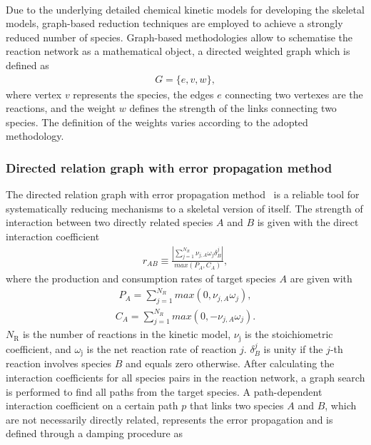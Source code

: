 \begin{refsection}
\\
Due to the underlying detailed chemical kinetic models for developing the skeletal models, graph-based reduction techniques are employed to achieve a strongly reduced number of species. Graph-based methodologies allow to schematise the reaction network as a mathematical object, a directed weighted graph which is defined as
\begin{align}
G = \{e,v,w\},
\end{align}
where vertex $v$ represents the species, the edges $e$ connecting two vertexes are the reactions, and the weight $w$ defines the strength of the links connecting two species. The definition of the weights varies according to the adopted methodology.


\subsubsection{Directed relation graph with error propagation method}
The directed relation graph with error propagation method~\cite{PepiotDesjardins2008a} is a reliable tool for systematically reducing mechanisms to a skeletal version of itself. The strength of interaction between two directly related species $A$ and $B$ is given with the direct interaction coefficient
\begin{align}
r_{AB} \equiv \frac{|\sum_{j=1}^{N_R} \nu_{j,A}\omega_j\delta_{B}^{j}|}{max(P_A, C_A)},
\end{align}
where the production and consumption rates of target species $A$ are given with
\begin{align}
\label{eq:B1bProductionRate}
P_A = \sum_{j=1}^{N_R} max(0, \nu_{j,A}\omega_j),
\end{align}
\begin{align}
\label{eq:B1bConsumptionRate}
C_A = \sum_{j=1}^{N_R} max(0, -\nu_{j,A}\omega_j).
\end{align}
$N_\mathrm{R}$ is the number of reactions in the kinetic model, $\nu_\mathrm{j}$ is the stoichiometric coefficient, and $\omega_\mathrm{j}$ is the net reaction rate of reaction $j$. $\delta_{B}^{j}$ is unity if the $j$-th reaction involves species $B$ and equals zero otherwise. After calculating the interaction coefficients for all species pairs in the reaction network, a graph search is performed to find all paths from the target species. A path-dependent interaction coefficient on a certain path $p$ that links two species $A$ and $B$, which are not necessarily directly related, represents the error propagation and is defined through a damping procedure as

\end{refsection}
